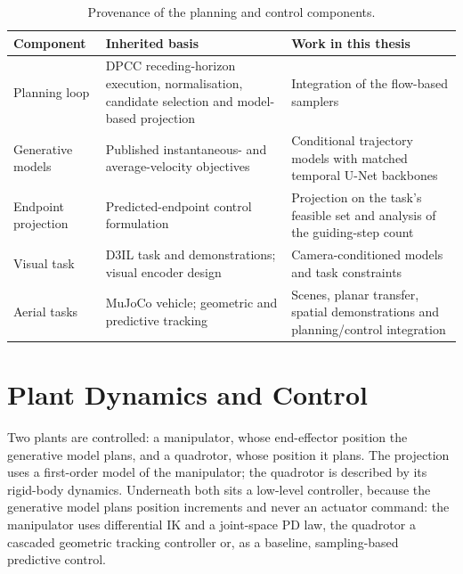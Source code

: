 \begin{table}[htpb]
  \caption[Method provenance]{Provenance of the planning and control components.}
  \label{tab:method-provenance}
  \centering\small
  \begin{tabularx}{\linewidth}{lLL}
    \toprule
    Component & Inherited basis & Work in this thesis \\
    \midrule
    Planning loop & DPCC receding-horizon execution, normalisation, candidate selection and
      model-based projection \parencite{romer2025diffusion} & Integration of the flow-based samplers \\
    Generative models & Published instantaneous- and average-velocity objectives
      \parencite{lipman2023flow,geng2025meanflow,zhang2025alphaflow} & Conditional trajectory models
      with matched temporal U-Net backbones \\
    Endpoint projection & Predicted-endpoint control formulation \parencite{li2025hardflow}
      & Projection on the task's feasible set and analysis of the guiding-step count \\
    Visual task & D3IL task and demonstrations; visual encoder design
      \parencite{jia2024towards,chi2023diffusion} & Camera-conditioned models and task constraints \\
    Aerial tasks & MuJoCo vehicle; geometric and predictive tracking
      \parencite{zakka2022menagerie,lee2010geometric,howell2022predictive}
      & Scenes, planar transfer, spatial demonstrations and planning/control integration \\
    \bottomrule
  \end{tabularx}
\end{table}

\section{Plant Dynamics and Control}\label{sec:method:dynamics}\label{sec:method:deployment}

Two plants are controlled: a manipulator, whose end-effector position the generative model plans, and
a quadrotor, whose position it plans. The projection uses a first-order model of the manipulator; the
quadrotor is described by its rigid-body dynamics. Underneath both sits a low-level controller, because
the generative model plans position increments and never an actuator command: the manipulator uses
differential \ac{IK} and a joint-space \ac{PD} law, the quadrotor a cascaded geometric tracking controller
or, as a baseline, sampling-based predictive control.

